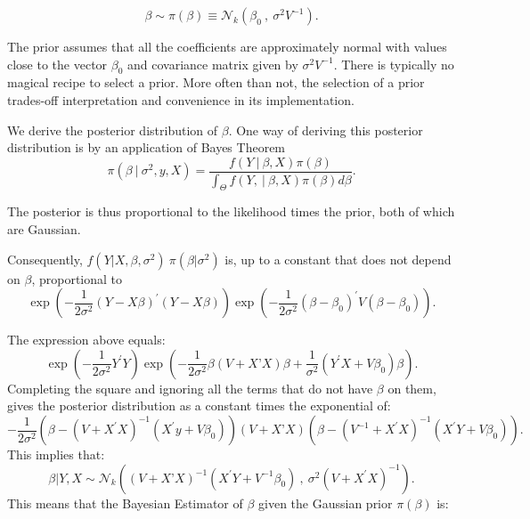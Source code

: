 \documentclass[11pt]{article} %
\begin{document}
\begin{equation}
\beta  \sim \pi (\beta) \equiv \mathcal{N}_{k}( \beta_0 \: , \: \sigma^2 V^{-1}).
\end{equation}

\noindent The prior assumes that all the coefficients are approximately normal with values close to the vector $\beta_0$ and covariance matrix given by $\sigma^2 V^{-1}$. There is typically no magical recipe to select a prior. More often than not, the selection of a prior trades-off interpretation and convenience in its implementation. 

We derive the posterior distribution of $\beta$. One way of deriving this posterior distribution is by an application of Bayes Theorem
\begin{equation*}
\pi(\beta \: | \: \sigma^2, y, X ) = \frac{f(Y  \: | \: \beta, X) \pi(\beta ) }{\int_{\Theta} f(Y, \: | \: \beta, X) \pi (\beta ) d \beta}. 
\end{equation*}

\noindent The posterior is thus proportional to the likelihood times the prior, both of which are Gaussian. 

\noindent Consequently, $f(Y | X, \beta, \sigma^2 )\:  \pi(\beta | \sigma^2 )$ is, up to a constant that does not depend on $\beta$, proportional to
\begin{equation} \label{equation:posterior}
\exp \left( -\frac{1}{2\sigma^2} (Y-X\beta)^{\prime} (Y-X \beta) \right)  \exp \left(-\frac{1}{2 \sigma^2} (\beta-\beta_0)^{\prime} V (\beta-\beta_0) \right). 
\end{equation}

\noindent The expression above equals:
\[ \exp \left( -\frac{1}{2\sigma^2} Y^{\prime} Y \right) \exp \left(  - \frac{1}{2 \sigma^2 } \beta \left(V + X’X \right) \beta + \frac{1}{\sigma^2}(Y^{\prime} X+V\beta_0) \beta \right). \]
Completing the square and ignoring all the terms that do not have $\beta$ on them, gives the posterior distribution as a constant times the exponential of:
\begin{equation*}
-\frac{1}{2 \sigma^2} \left( \beta -  \left( V + X^{\prime} X \right)^{-1} (X^{\prime} y+ V \beta_0) \right) \left(V+ X’X \right) \left(\beta -  ( V^{-1} + X^{\prime} X )^{-1} (X^{\prime} Y+ V \beta_0) \right). 
\end{equation*}
This implies that:
\begin{equation}
\beta | Y, X \sim \mathcal{N}_{k} \left(  \left( V + X’X \right)^{-1} (X^{\prime} Y+V^{-1}\beta_0) \: , \:   \sigma^2 \left(V + X^{\prime} X \right)^{-1}   \right).
\end{equation}
This means that the Bayesian Estimator of $\beta$ given the Gaussian prior $\pi(\beta)$ is:
\end{document}
